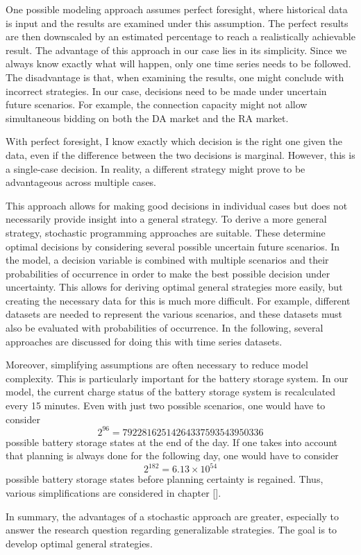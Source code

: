 One possible modeling approach assumes perfect foresight, where historical data is input and the results are examined under this assumption.
The perfect results are then downscaled by an estimated percentage to reach a realistically achievable result.
The advantage of this approach in our case lies in its simplicity. Since we always know exactly what will happen, only one time series needs to be followed.
The disadvantage is that, when examining the results, one might conclude with incorrect strategies.
In our case, decisions need to be made under uncertain future scenarios.
For example, the connection capacity might not allow simultaneous bidding on both the DA market and the RA market.

With perfect foresight, I know exactly which decision is the right one given the data, even if the difference between the two decisions is marginal.
However, this is a single-case decision. In reality, a different strategy might prove to be advantageous across multiple cases.


This approach allows for making good decisions in individual cases but does not necessarily provide insight into a general strategy.
To derive a more general strategy, stochastic programming approaches are suitable. These determine optimal decisions by considering several possible uncertain future scenarios.
In the model, a decision variable is combined with multiple scenarios and their probabilities of occurrence in order to make the best possible decision under uncertainty.
This allows for deriving optimal general strategies more easily, but creating the necessary data for this is much more difficult.
For example, different datasets are needed to represent the various scenarios, and these datasets must also be evaluated with probabilities of occurrence.
In the following, several approaches are discussed for doing this with time series datasets.

Moreover, simplifying assumptions are often necessary to reduce model complexity. This is particularly important for the battery storage system.
In our model, the current charge status of the battery storage system is recalculated every 15 minutes. Even with just two possible scenarios, one would have to consider
\[
	2^{96} = 79228162514264337593543950336
\]
possible battery storage states at the end of the day. If one takes into account that planning is always done for the following day,
one would have to consider
\[
	2^{182} = 6.13 \times 10^{54}
\]
possible battery storage states before planning certainty is regained.
Thus, various simplifications are considered in chapter [].


In summary, the advantages of a stochastic approach are greater, especially to answer the research question regarding generalizable strategies.
The goal is to develop optimal general strategies.
